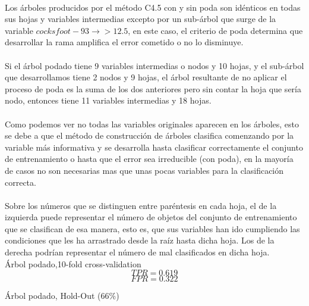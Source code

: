 \documentclass[es]{ifirak}
\begin{document}
\paragraph{}
Los árboles producidos por el método C4.5 con y sin poda son idénticos en todas sus hojas y variables intermedias excepto por un sub-árbol que surge de la variable $cocksfoot-93 \rightarrow > 12.5$, en este caso, el criterio de poda determina que desarrollar la rama amplifica el error cometido o no lo disminuye. 

\paragraph{}
Si el árbol podado tiene 9 variables intermedias o nodos y 10 hojas, y el sub-árbol que desarrollamos tiene 2 nodos y 9 hojas, el árbol resultante de no aplicar el proceso de poda es la suma de los dos anteriores pero sin contar la hoja que sería nodo, entonces tiene 11 variables intermedias y 18 hojas.
\paragraph{}
Como podemos ver no todas las variables originales aparecen en los árboles, esto se debe a que el método de construcción de árboles clasifica comenzando por la variable más informativa y se desarrolla hasta clasificar correctamente el conjunto de entrenamiento o hasta que el error sea irreducible (con poda), en la mayoría de casos no son necesarias mas que unas pocas variables para la clasificación correcta.
\paragraph{}
Sobre los números que se distinguen entre paréntesis en cada hoja, el de la izquierda puede representar el número de objetos del conjunto de entrenamiento que se clasifican de esa manera, esto es, que sus variables han ido cumpliendo las condiciones que les ha arrastrado desde la raíz hasta dicha hoja. Los de la derecha podrían representar el número de mal clasificados en dicha hoja.\\

\vspace{0.4cm}
Árbol podado,10-fold cross-validation\\

$$TPR = 0.619		$$	
$$FPR = 0.322$$

Árbol podado, Hold-Out (66\%)\\
\end{document}
